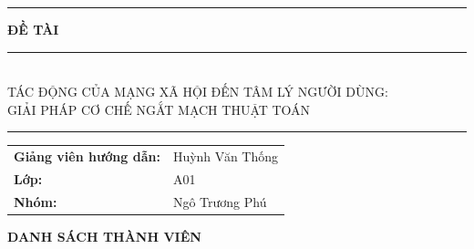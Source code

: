\documentclass[a4paper]{article}
\begin{document}
\begin{titlepage}
\begin{center}
\begin{minipage}{0.9\textwidth}
    \justifying\centering
   \textcolor{bku_blue_bold}{ \rule{6.5cm}{0.4pt}} \textcolor{bku_blue_bold}{\textbf{\fontsize{13}{20}\selectfont ĐỀ TÀI } }\textcolor{bku_blue_bold}{ \rule{6.5cm}{0.4pt}}\\
    \vspace{0.3cm}
   \textcolor{bku_blue}{ \onehalfspacing \fontsize{13}{20}\selectfont
TÁC ĐỘNG CỦA MẠNG XÃ HỘI ĐẾN TÂM LÝ NGƯỜI DÙNG: \\
GIẢI PHÁP CƠ CHẾ NGẮT MẠCH THUẬT TOÁN \\
    }
    \vspace{0.5cm}
    \textcolor{bku_blue_bold}{ \rule{15cm}{0.4pt}}
\end{minipage}
\end{center}

\begin{center}
\begin{table}[h]
\centering
\renewcommand{\arraystretch}{1.5} 
    \begin{tabular}{p{5cm} p{6cm}} 
    \textcolor{bku_blue_bold}{
    \fontsize{13}{20}\selectfont \textbf{Giảng viên hướng dẫn:}} & \textcolor{bku_blue_bold}{\fontsize{13}{20}\selectfont }Huỳnh Văn Thống\\ 
\textcolor{bku_blue_bold}{\fontsize{13}{20}\selectfont \textbf{Lớp:}} & \textcolor{bku_blue_bold}{\fontsize{13}{20}\selectfont }A01 \\
        \textcolor{bku_blue_bold}{\fontsize{13}{20}\selectfont \textbf{Nhóm:}} & \fontsize{13}{20}\selectfont Ngô Trương Phú \\
    \end{tabular}
\end{table}
\end{center}

\end{titlepage}
\newpage

\begin{center}
    { \fontsize{20}{20}\selectfont\textbf{ DANH SÁCH THÀNH VIÊN}}\\
\end{center}
\end{document}
